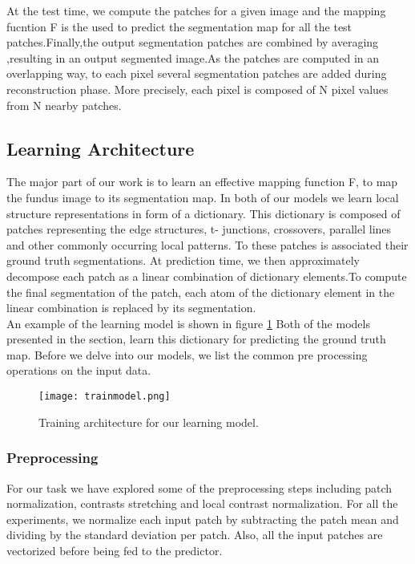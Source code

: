 At the test time, we compute the patches for a given image and the mapping fucntion F is the used to predict the segmentation map for all the test patches.Finally,the output segmentation patches are combined by averaging ,resulting in an output segmented image.As the patches are computed in an overlapping way, to each pixel several segmentation patches are added during reconstruction phase. More precisely, each pixel is composed of N pixel values from N nearby patches.\\

\subsection{Learning Architecture}
The major part of our work is to learn an effective mapping function F, to map the fundus image to its segmentation map. In both of our models we learn local structure representations in form of a dictionary. This dictionary is composed of patches representing the edge structures, t- junctions, crossovers, parallel lines and other commonly occurring local patterns. To these patches is associated their ground truth segmentations. At prediction time, we then approximately decompose each patch as a linear combination of dictionary elements.To compute the final segmentation of the patch, each atom of the dictionary element in the linear combination is replaced by its segmentation.\\

An example of the learning model is shown in figure \ref{fig:trainmodel}
Both of the models presented in the section, learn this dictionary for predicting the ground truth map.
Before we delve into our models, we list the common pre processing operations on the input data.
\begin{figure}
	\centering	
	\texttt{[image: trainmodel.png]}
	\caption{Training architecture for our learning model.}
	\label{fig:trainmodel}		
\end{figure}
\subsubsection{Preprocessing}
For our task we have explored some of the preprocessing steps including patch normalization, contrasts stretching and local contrast normalization. For all the experiments, we normalize each input patch by subtracting the patch mean and dividing by the standard deviation per patch. Also, all the input patches are vectorized before being fed to the predictor.


